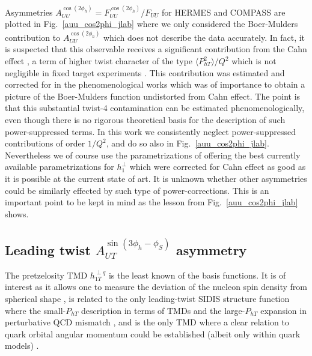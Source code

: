 \documentclass[a4paper,11pt]{article}
\newcommand{\blue}[1]{{\color{blue} #1}}
\newcommand{\la}{\langle}
\newcommand{\ra}{\rangle}
\newcommand{\ps}[1]{\blue{ #1}}
\def\Phperp{P_{hT}}
\begin{document}
Asymmetries $A_{UU}^{\cos(2\phi_h)}=F_{UU}^{\cos(2\phi_h)}/F_{UU}$ for 
HERMES \cite{Airapetian:2012yg} and COMPASS \cite{Adolph:2014pwc}
are plotted in Fig.~\ref{auu_cos2phi_jlab} where we only considered the
Boer-Mulders contribution to $A_{UU}^{\cos(2\phi_h)}$ which does not describe
the data accurately. In fact, it is suspected that this observable receives 
a significant contribution from the Cahn effect \cite{Cahn:1978se}, a 
term of higher twist character of the type $\la\Phperp^2\ra/Q^2$ which 
is not negligible in fixed target experiments \cite{Schweitzer:2010tt}. 
This contribution was estimated and corrected for in the phenomenological 
works \cite{Barone:2009hw,Barone:2010gk,Barone:2015ksa} which was of
importance to obtain a picture of the Boer-Mulders function undistorted 
from Cahn effect. The point is that this substantial twist-4 contamination 
can be estimated phenomenologically, even though there is no rigorous 
theoretical basis for the description of such power-suppressed terms. 
In this work we consistently neglect power-suppressed contributions of 
order $1/Q^2$, and do so also in Fig.~\ref{auu_cos2phi_jlab}. 
Nevertheless we of course use the parametrizations of 
\cite{Barone:2009hw,Barone:2010gk,Barone:2015ksa} offering
the best currently available parametrizations for $h_1^{\perp}$
which were corrected for Cahn effect as good as it is possible at
the current state of art. It is unknown whether other asymmetries
could be similarly effected by such type of power-corrections.
This is an important point to be kept in mind as the lesson 
from Fig.~\ref{auu_cos2phi_jlab} shows.


\newpage
\subsection{\boldmath Leading twist $A_{UT}^{\sin(3\phi_h-\phi_S)}$  asymmetry}
\label{Sec-5.6:pretzel-basis}

\ps{The pretzelosity TMD $h_{1T}^{\perp q}$ is the least known of the basis 
functions. It is of interest as it allows one to measure the deviation 
of the nucleon spin density from spherical shape \cite{Miller:2007ae},
is related to the only leading-twist SIDIS structure function where the 
small-$P_{hT}$ description in terms of TMDs and the large-$P_{hT}$ expansion 
in perturbative QCD mismatch \cite{Bacchetta:2008xw}, and is the only
TMD where a clear relation to quark orbital angular momentum
could be established (albeit only within quark models)
\cite{Avakian:2008dz,She:2009jq,Avakian:2010br,Lorce:2011kn}.
}
\end{document}
